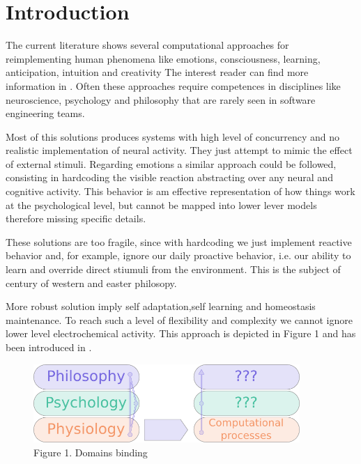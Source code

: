\section{Introduction}\label{introductionbackground}

The current literature shows several computational approaches for reimplementing human phenomena like emotions, consciousness, learning, anticipation, intuition and creativity The interest reader can find more information in \cite{neucogar2015, evaluatingcomutationalmodel, computationalmodelsemotionscognition, computationalmodelsemotion}. Often these approaches require competences in disciplines like neuroscience, psychology and philosophy that are rarely seen in software engineering teams. 

Most of this solutions produces systems with high level of concurrency and no realistic implementation of neural activity. They just attempt to mimic the effect of external stimuli.
Regarding emotions a similar approach could be followed, consisting in hardcoding the visible reaction abstracting over any neural and cognitive activity. This behavior is am effective representation of how things work at the psychological level, but cannot be mapped into lower lever models therefore missing specific details.

These solutions are too fragile, since with hardcoding we just implement reactive behavior and, for example, ignore our daily proactive behavior, i.e. our ability to learn and override direct stiumuli from the environment. This is the subject of century of western and easter philosopy.

More robust solution imply self adaptation,self learning and homeostasis maintenance. To reach such a level of flexibility and complexity we cannot ignore lower level electrochemical activity.
This approach is depicted in Figure 1 and has been introduced in \cite{p3_model}.
 

\begin{figure}[htbp]
\centering

\includegraphics[width=0.9\textwidth]{layers_binding}
\caption{Figure 1. Domains binding}
\end{figure}

